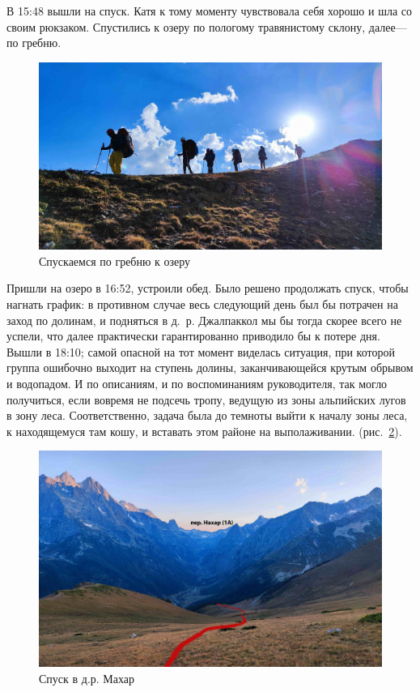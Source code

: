 В 15:48 вышли на спуск. Катя к тому моменту чувствовала себя хорошо и шла со своим рюкзаком.
Спустились к озеру по пологому травянистому склону, далее--- по гребню.

\begin{figure}[h!]
	\centering
	\includegraphics[width=0.7\linewidth]{../pics/IMG_20240820_164917.jpg}
	\caption{Спускаемся по гребню к озеру}
	\label{fig:IMG_20240820_164917.jpg}
\end{figure}

Пришли на озеро в 16:52, устроили обед. Было решено продолжать спуск, чтобы нагнать график: в противном случае весь следующий день был бы потрачен на заход по долинам, и подняться в д.~р. Джалпаккол мы бы тогда скорее всего не успели, что далее практически гарантированно приводило бы к потере дня. Вышли в 18:10; самой опасной на тот момент виделась ситуация, при которой группа ошибочно выходит на ступень долины, заканчивающейся крутым обрывом и водопадом. И по описаниям, и по воспоминаниям руководителя, так могло получиться, если вовремя не подсечь тропу, ведущую из зоны альпийских лугов в зону леса. Соответственно, задача была до темноты выйти к началу зоны леса, к находящемуся там кошу, и вставать этом районе на выполаживании.  (рис.~\ref{fig:IMG_20240820_184645.jpg}).

\begin{figure}[h!]
	\centering
	\includegraphics[width=0.7\linewidth]{../pics/IMG_20240820_184645.jpg}
	\caption{Спуск в д.р. Махар}
	\label{fig:IMG_20240820_184645.jpg}
\end{figure}

